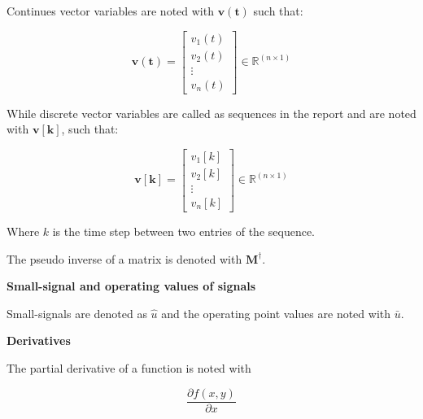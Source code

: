 

Continues vector variables are noted with $\bm{v(t)}$ such that:

\begin{equation}
\bm{v(t)} = 
\begin{bmatrix}

		 v_1(t) 	\\
		 v_2(t)	\\
		 \vdots \\
		 v_n(t)

\end{bmatrix}
\in \pmb{{\mathbb{R}}}^{(n \times 1)}
\end{equation}

While discrete vector variables are called as sequences in the report and are noted with $\bm{v[k]}$, such that:

\begin{equation}
\bm{v[k]} = 
\begin{bmatrix}

		 v_1[k] 	\\
		 v_2[k]	\\
		 \vdots \\
		 v_n[k]

\end{bmatrix}
\in \pmb{{\mathbb{R}}}^{(n \times 1)}
\end{equation}

Where $k$ is the time step between two entries of the sequence.

The pseudo inverse of a matrix is denoted with $\bm{{M}^{\dagger}}$.

 \textbf{Small-signal and operating values of signals}

Small-signals are denoted as $\hat{u}$ and the operating point values are noted with $\bar{u}$.

 \textbf{Derivatives}

 The partial derivative of a function is noted with

\begin{equation}
\frac{\partial{f(x,y)}}{\partial{x}}
\end{equation}



